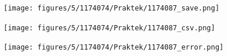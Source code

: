 \begin{figure}[ht]
	\texttt{[image: figures/5/1174074/Praktek/1174087\_save.png]}
	\centering
\end{figure}

\begin{figure}[ht]
	\texttt{[image: figures/5/1174074/Praktek/1174087\_csv.png]}
	\centering
\end{figure}

\begin{figure}[ht]
	\texttt{[image: figures/5/1174074/Praktek/1174087\_error.png]}
	\centering
\end{figure}
